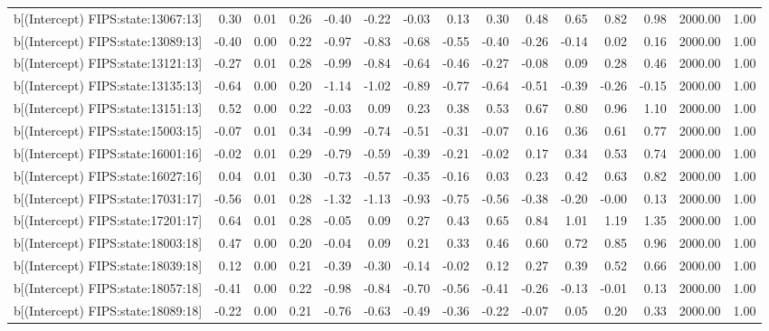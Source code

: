 \begin{table}[ht]
\begin{tabular}{rrrrrrrrrrrrrrr}
  b[(Intercept) FIPS:state:13067:13] & 0.30 & 0.01 & 0.26 & -0.40 & -0.22 & -0.03 & 0.13 & 0.30 & 0.48 & 0.65 & 0.82 & 0.98 & 2000.00 & 1.00 \\ 
  b[(Intercept) FIPS:state:13089:13] & -0.40 & 0.00 & 0.22 & -0.97 & -0.83 & -0.68 & -0.55 & -0.40 & -0.26 & -0.14 & 0.02 & 0.16 & 2000.00 & 1.00 \\ 
  b[(Intercept) FIPS:state:13121:13] & -0.27 & 0.01 & 0.28 & -0.99 & -0.84 & -0.64 & -0.46 & -0.27 & -0.08 & 0.09 & 0.28 & 0.46 & 2000.00 & 1.00 \\ 
  b[(Intercept) FIPS:state:13135:13] & -0.64 & 0.00 & 0.20 & -1.14 & -1.02 & -0.89 & -0.77 & -0.64 & -0.51 & -0.39 & -0.26 & -0.15 & 2000.00 & 1.00 \\ 
  b[(Intercept) FIPS:state:13151:13] & 0.52 & 0.00 & 0.22 & -0.03 & 0.09 & 0.23 & 0.38 & 0.53 & 0.67 & 0.80 & 0.96 & 1.10 & 2000.00 & 1.00 \\ 
  b[(Intercept) FIPS:state:15003:15] & -0.07 & 0.01 & 0.34 & -0.99 & -0.74 & -0.51 & -0.31 & -0.07 & 0.16 & 0.36 & 0.61 & 0.77 & 2000.00 & 1.00 \\ 
  b[(Intercept) FIPS:state:16001:16] & -0.02 & 0.01 & 0.29 & -0.79 & -0.59 & -0.39 & -0.21 & -0.02 & 0.17 & 0.34 & 0.53 & 0.74 & 2000.00 & 1.00 \\ 
  b[(Intercept) FIPS:state:16027:16] & 0.04 & 0.01 & 0.30 & -0.73 & -0.57 & -0.35 & -0.16 & 0.03 & 0.23 & 0.42 & 0.63 & 0.82 & 2000.00 & 1.00 \\ 
  b[(Intercept) FIPS:state:17031:17] & -0.56 & 0.01 & 0.28 & -1.32 & -1.13 & -0.93 & -0.75 & -0.56 & -0.38 & -0.20 & -0.00 & 0.13 & 2000.00 & 1.00 \\ 
  b[(Intercept) FIPS:state:17201:17] & 0.64 & 0.01 & 0.28 & -0.05 & 0.09 & 0.27 & 0.43 & 0.65 & 0.84 & 1.01 & 1.19 & 1.35 & 2000.00 & 1.00 \\ 
  b[(Intercept) FIPS:state:18003:18] & 0.47 & 0.00 & 0.20 & -0.04 & 0.09 & 0.21 & 0.33 & 0.46 & 0.60 & 0.72 & 0.85 & 0.96 & 2000.00 & 1.00 \\ 
  b[(Intercept) FIPS:state:18039:18] & 0.12 & 0.00 & 0.21 & -0.39 & -0.30 & -0.14 & -0.02 & 0.12 & 0.27 & 0.39 & 0.52 & 0.66 & 2000.00 & 1.00 \\ 
  b[(Intercept) FIPS:state:18057:18] & -0.41 & 0.00 & 0.22 & -0.98 & -0.84 & -0.70 & -0.56 & -0.41 & -0.26 & -0.13 & -0.01 & 0.13 & 2000.00 & 1.00 \\ 
  b[(Intercept) FIPS:state:18089:18] & -0.22 & 0.00 & 0.21 & -0.76 & -0.63 & -0.49 & -0.36 & -0.22 & -0.07 & 0.05 & 0.20 & 0.33 & 2000.00 & 1.00 \\ 

\end{tabular}
\end{table}
